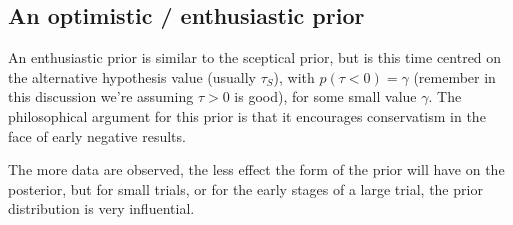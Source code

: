 \documentclass[
  openany]{book}
\theoremstyle{definition}
\theoremstyle{definition}
\theoremstyle{definition}
\theoremstyle{definition}
\theoremstyle{remark}
\begin{document}
\hypertarget{an-optimistic-enthusiastic-prior}{%
\subsection*{An optimistic / enthusiastic prior}\label{an-optimistic-enthusiastic-prior}}

An enthusiastic prior is similar to the sceptical prior, but is this time centred on the alternative hypothesis value (usually \(\tau_S\)), with \(p\left(\tau<0\right) = \gamma\) (remember in this discussion we're assuming \(\tau>0\) is good), for some small value \(\gamma\). The philosophical argument for this prior is that it encourages conservatism in the face of early negative results.

The more data are observed, the less effect the form of the prior will have on the posterior, but for small trials, or for the early stages of a large trial, the prior distribution is very influential.
\end{document}
